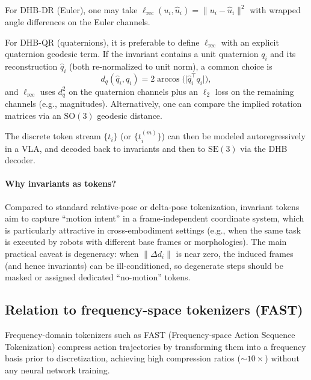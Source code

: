 \documentclass[11pt]{article}
\begin{document}
For DHB-DR (Euler), one may take $\ell_{\mathrm{rec}}(u_i,\hat u_i)=\lVert u_i-\hat u_i\rVert^2$ with wrapped angle differences on the Euler channels.

For DHB-QR (quaternions), it is preferable to define $\ell_{\mathrm{rec}}$ with an explicit quaternion geodesic term. If the invariant contains a unit quaternion $q_i$ and its reconstruction $\hat q_i$ (both re-normalized to unit norm), a common choice is
\begin{equation}
  d_q(\hat q_i,q_i) = 2\arccos\bigl(\lvert \hat q_i^\top q_i \rvert\bigr),
\end{equation}
and $\ell_{\mathrm{rec}}$ uses $d_q^2$ on the quaternion channels plus an $\ell_2$ loss on the remaining channels (e.g., magnitudes). Alternatively, one can compare the implied rotation matrices via an $\mathrm{SO}(3)$ geodesic distance.

The discrete token stream $\{t_i\}$ (or $\{t_i^{(m)}\}$) can then be modeled autoregressively in a VLA, and decoded back to invariants and then to $\mathrm{SE}(3)$ via the DHB decoder.

\paragraph{Why invariants as tokens?}
Compared to standard relative-pose or delta-pose tokenization, invariant tokens aim to capture ``motion intent'' in a frame-independent coordinate system, which is particularly attractive in cross-embodiment settings (e.g., when the same task is executed by robots with different base frames or morphologies). The main practical caveat is degeneracy: when $\lVert\Delta d_i\rVert$ is near zero, the induced frames (and hence invariants) can be ill-conditioned, so degenerate steps should be masked or assigned dedicated ``no-motion'' tokens.

\subsection{Relation to frequency-space tokenizers (FAST)}
Frequency-domain tokenizers such as FAST (Frequency-space Action Sequence Tokenization) \cite{fast2025} compress action trajectories by transforming them into a frequency basis prior to discretization, achieving high compression ratios (${\sim}10\times$) without any neural network training.
\end{document}
